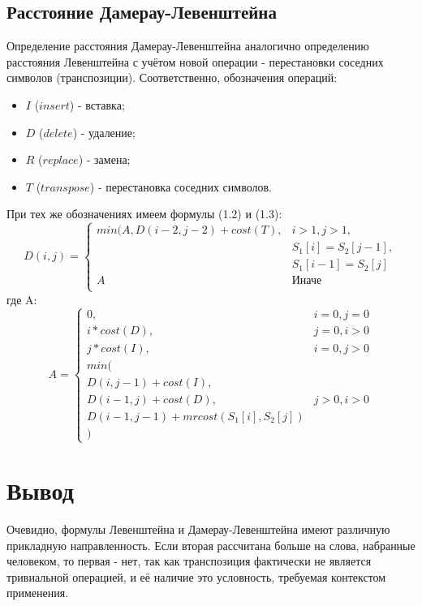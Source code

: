 \subsection{Расстояние Дамерау-Левенштейна}
Определение расстояния Дамерау-Левенштейна аналогично определению расстояния Левенштейна с учётом новой операции - перестановки соседних символов (транспозиции). Соответственно, обозначения операций:
\begin{itemize}
    \item $I$ ($insert$) - вставка;
    \item $D$ ($delete$) - удаление;
    \item $R$ ($replace$) - замена;
    \item $T$ ($transpose$) - перестановка соседних символов.
\end{itemize}

При тех же обозначениях имеем формулы (1.2) и (1.3):
\begin{equation}
D(i,j) = \left\{ \begin{array}{ll}
 min(A, D(i - 2, j - 2) + cost(T), & \textrm{$i > 1, j > 1,$}\\
 & \textrm{$S_1[i] = S_2[j - 1],$}\\
 & \textrm{$S_1[i - 1] = S_2[j]$}\\
 A & \textrm{Иначе}\\
  \end{array} \right.
\end{equation}
где A:
\begin{equation}
A = \left\{ \begin{array}{ll}
 0, & \textrm{$i = 0, j = 0$}\\
 i * cost(D), & \textrm{$j = 0, i > 0$}\\
 j * cost(I), & \textrm{$i = 0, j > 0$}\\
min(\\
D(i,j-1) + cost(I),\\
D(i-1, j) + cost(D), &\textrm{$j > 0, i > 0$}\\
D(i-1, j-1) + mrcost(S_1[i], S_2[j])\\
)
  \end{array} \right.
\end{equation}

\section{Вывод}
Очевидно, формулы Левенштейна и Дамерау-Левенштейна имеют различную прикладную направленность. Если вторая рассчитана больше на слова, набранные человеком, то первая - нет, так как транспозиция фактически не является тривиальной операцией, и её наличие это условность, требуемая контекстом применения.

